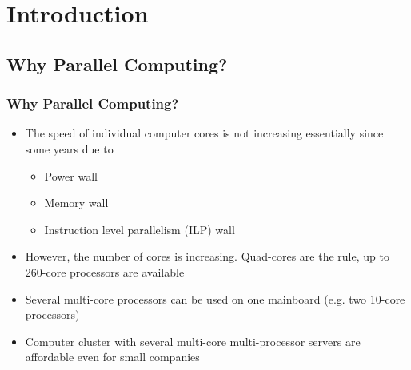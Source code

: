 
\section{Introduction}

\subsection{Why Parallel Computing?}

\begin{frame}
\frametitle<presentation>{Why Parallel Computing?}

\begin{itemize}
\item The speed of individual computer cores is not increasing essentially since some years due to
\begin{itemize}
\item Power wall
\item Memory wall
\item Instruction level parallelism (ILP) wall
\end{itemize}
\item However, the number of cores is increasing. Quad-cores are the rule, up to 260-core processors are available
\item Several multi-core processors can be used on one mainboard (e.g. two 10-core processors)
\item Computer cluster with several multi-core multi-processor servers are affordable even for small companies
\end{itemize}

\end{frame}


